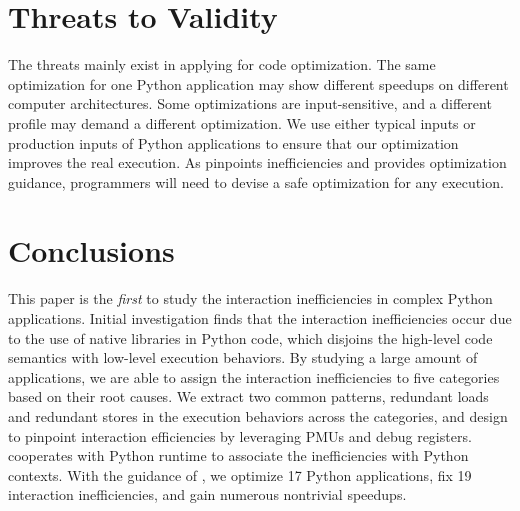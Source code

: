 \section{Threats to Validity}
\label{validity}
The threats mainly exist in applying \tool{} for code optimization. The same optimization for one Python application may show different speedups on different computer architectures. Some optimizations are input-sensitive, and a different profile may demand a different optimization. We use either typical inputs or production inputs of Python applications to ensure that our optimization improves the real execution.  As \tool{} pinpoints inefficiencies and provides optimization guidance, programmers will need to devise a safe optimization for any execution.


\section{Conclusions}
\label{conclusions}

This paper is the {\it first} to study the interaction inefficiencies in complex Python applications. Initial investigation finds that the interaction inefficiencies occur due to the use of native libraries in Python code, which disjoins the high-level code semantics with low-level execution behaviors. By studying a large amount of applications, we are able to assign the interaction inefficiencies to five categories based on their root causes. We extract two common patterns, redundant loads and redundant stores in the execution behaviors across the categories, and design \tool to pinpoint interaction efficiencies by leveraging PMUs and debug registers. \tool cooperates with Python runtime to associate the inefficiencies with Python contexts. With the guidance of \tool, we optimize 17 Python applications, fix 19 interaction inefficiencies, and gain numerous nontrivial speedups.




